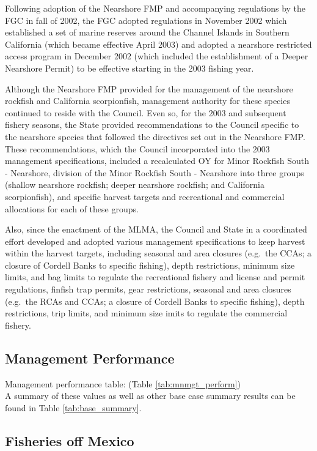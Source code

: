 \documentclass[12pt,]{article}
\begin{document}
Following adoption of the Nearshore FMP and accompanying regulations by
the FGC in fall of 2002, the FGC adopted regulations in November 2002
which established a set of marine reserves around the Channel Islands in
Southern California (which became effective April 2003) and adopted a
nearshore restricted access program in December 2002 (which included the
establishment of a Deeper Nearshore Permit) to be effective starting in
the 2003 fishing year.

Although the Nearshore FMP provided for the management of the nearshore
rockfish and California scorpionfish, management authority for these
species continued to reside with the Council. Even so, for the 2003 and
subsequent fishery seasons, the State provided recommendations to the
Council specific to the nearshore species that followed the directives
set out in the Nearshore FMP. These recommendations, which the Council
incorporated into the 2003 management specifications, included a
recalculated OY for Minor Rockfish South - Nearshore, division of the
Minor Rockfish South - Nearshore into three groups (shallow nearshore
rockfish; deeper nearshore rockfish; and California scorpionfish), and
specific harvest targets and recreational and commercial allocations for
each of these groups.

Also, since the enactment of the MLMA, the Council and State in a
coordinated effort developed and adopted various management
specifications to keep harvest within the harvest targets, including
seasonal and area closures (e.g.~the CCAs; a closure of Cordell Banks to
specific fishing), depth restrictions, minimum size limits, and bag
limits to regulate the recreational fishery and license and permit
regulations, finfish trap permits, gear restrictions, seasonal and area
closures (e.g.~the RCAs and CCAs; a closure of Cordell Banks to specific
fishing), depth restrictions, trip limits, and minimum size imits to
regulate the commercial fishery.

\subsection{Management Performance}\label{management-performance-1}

Management performance table: (Table \ref{tab:mnmgt_perform})\\
A summary of these values as well as other base case summary results can
be found in Table \ref{tab:base_summary}.

\subsection{Fisheries off Mexico}\label{fisheries-off-mexico}
\end{document}
